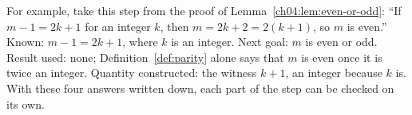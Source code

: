 For example, take this step from the proof of Lemma~\ref{ch04:lem:even-or-odd}: ``If $m-1=2k+1$ for an integer $k$, then $m=2k+2=2(k+1)$, so $m$ is even.'' Known: $m-1=2k+1$, where $k$ is an integer. Next goal: $m$ is even or odd. Result used: none; Definition~\ref{def:parity} alone says that $m$ is even once it is twice an integer. Quantity constructed: the witness $k+1$, an integer because $k$ is. With these four answers written down, each part of the step can be checked on its own.
